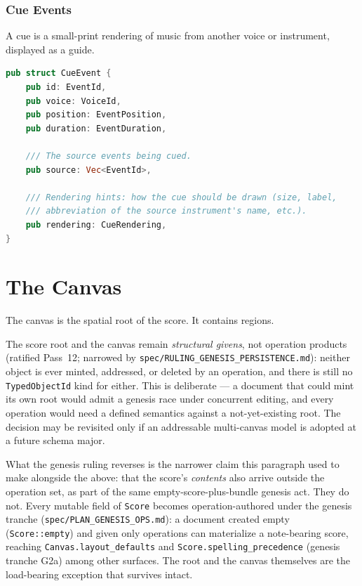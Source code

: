\documentclass[11pt,letterpaper]{report}
\begin{document}
\subsubsection{Cue Events}

A cue is a small-print rendering of music from another voice or
instrument, displayed as a guide.

\begin{lstlisting}[language=Rust]
pub struct CueEvent {
    pub id: EventId,
    pub voice: VoiceId,
    pub position: EventPosition,
    pub duration: EventDuration,

    /// The source events being cued.
    pub source: Vec<EventId>,

    /// Rendering hints: how the cue should be drawn (size, label,
    /// abbreviation of the source instrument's name, etc.).
    pub rendering: CueRendering,
}
\end{lstlisting}

\section{The Canvas}
\label{sec:graph:canvas}

The canvas is the spatial root of the score. It contains regions.

The score root and the canvas remain \emph{structural givens}, not
operation products (ratified Pass~12; narrowed by
\texttt{spec/RULING\_GENESIS\_PERSISTENCE.md}): neither object is ever
minted, addressed, or deleted by an operation, and there is still no
\texttt{TypedObjectId} kind for either. This is
deliberate --- a document that could mint its own root would admit a
genesis race under concurrent editing, and every operation would need
a defined semantics against a not-yet-existing root. The decision may
be revisited only if an addressable multi-canvas model is adopted at
a future schema major.

What the genesis ruling reverses is the narrower claim this paragraph used
to make alongside the above: that the score's \emph{contents} also arrive
outside the operation set, as part of the same empty-score-plus-bundle
genesis act. They do not. Every mutable field of \texttt{Score} becomes
operation-authored under the genesis tranche
(\texttt{spec/PLAN\_GENESIS\_OPS.md}): a document created empty
(\texttt{Score::empty}) and given only operations can materialize a
note-bearing score, reaching \texttt{Canvas.layout\_defaults}
and \texttt{Score.spelling\_precedence} (genesis tranche G2a) among other
surfaces. The root and the canvas themselves are the load-bearing
exception that survives intact.
\end{document}
